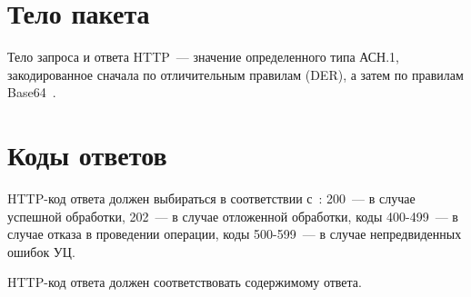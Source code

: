 \section{Тело пакета}\label{TRANSPORT.Body}

Тело запроса и ответа HTTP~--- значение определенного типа АСН.1, 
закодированное сначала по отличительным правилам (DER), 
а затем по правилам Base64~\cite{BASE64}.

\section{Коды ответов}\label{TRANSPORT.Codes}

HTTP-код ответа должен выбираться в соответствии с~\cite{HTTP}: 
200~--- в случае успешной обработки, 
202~--- в случае отложенной обработки,
коды 400-499~--- в случае отказа в проведении операции,
коды 500-599~--- в случае непредвиденных ошибок УЦ.

HTTP-код ответа должен соответствовать содержимому ответа.

